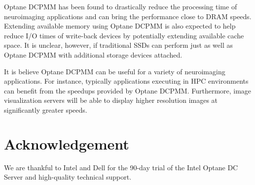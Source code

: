 \documentclass[conference]{IEEEtran}
\begin{document}
Optane DCPMM has been found to drastically reduce the processing time of neuroimaging applications and
can bring the performance close to DRAM speeds. Extending available memory using Optane DCPMM is also 
expected to help reduce I/O times of write-back devices by potentially extending available cache space.
It is unclear, however, if traditional SSDs can perform just as well as Optane DCPMM with additional storage devices
attached.

It is believe Optane DCPMM can be useful for a variety of neuroimaging applications. For
instance, typically applications executing in HPC environments can benefit from 
the speedups provided by Optane DCPMM. Furthermore, image visualization servers will be able
to display higher resolution images at significantly greater speeds.
\section{Acknowledgement}
We are thankful to Intel and Dell
for the 90-day trial of the Intel Optane DC Server and high-quality technical support.
 

\end{document}
